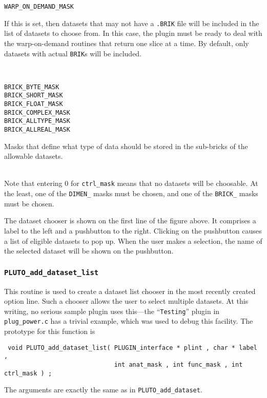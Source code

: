 \begin{tabbing}
{               \parbox[t]{1.6in}{\tt WARP\_ON\_DEMAND\_MASK}
               \parbox[t]{3.5in}{If this is set, then datasets that may
                                 not have a {\tt .BRIK} file will be included
                                 in the list of datasets to choose from.
                                 In this case, the plugin must be ready
                                 to deal with the warp-on-demand routines
                                 that return one slice at a time.
                                 By default, only datasets with actual
                                 {\tt BRIK}s will be included.} \\[1ex]

               \parbox[t]{1.6in}{\tt BRICK\_BYTE\_MASK  \\
                                   BRICK\_SHORT\_MASK  \\
                                   BRICK\_FLOAT\_MASK  \\
                                   BRICK\_COMPLEX\_MASK  \\
                                   BRICK\_ALLTYPE\_MASK  \\
                                   BRICK\_ALLREAL\_MASK}
               \parbox[t]{3.5in}{
               Masks that define what type of data
               should be stored in the sub-bricks
               of the allowable datasets.} \\[1ex]

               Note that entering 0 for {\tt ctrl\_mask} means that no
               datasets will be choosable.  At the least, one of
               the {\tt DIMEN\_} masks must be chosen, and one of the 
               {\tt BRICK\_} masks must be chosen.}
\end{tabbing}
The dataset chooser is shown on the first line of the figure above.
It comprises a label to the left and a pushbutton to the right.
Clicking on the pushbutton causes a list of eligible datasets to
pop up.  When the user makes a selection, the name of the selected
dataset will be shown on the pushbutton.

\subsubsection{{\tt PLUTO\_add\_dataset\_list}}
This routine is used to create a dataset list chooser in the most
recently created option line.  Such a chooser allows the user to
select multiple datasets.  At this writing, no serious sample
plugin uses this---the ``{\tt Testing}'' plugin in {\tt plug\_power.c}
has a trivial example, which was used to debug this facility.
The prototype for this function is
\begin{samepage}\begin{verbatim}
 void PLUTO_add_dataset_list( PLUGIN_interface * plint , char * label ,
                              int anat_mask , int func_mask , int ctrl_mask ) ;
\end{verbatim}\end{samepage}
The arguments are exactly the same as in {\tt PLUTO\_add\_dataset}.

